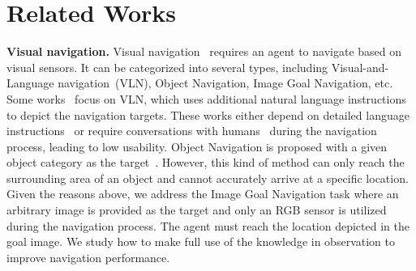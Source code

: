 \section{Related Works}
\textbf{Visual navigation.} Visual navigation~\cite{krantz2023navigating,kwon2023renderable,pelluri2024transformers,li2023improving,liu2024caven,sun2024fgprompt,wang2024lookahead,zhao2024over} requires an agent to navigate based on visual sensors. It can be categorized into several types, including Visual-and-Language navigation~(VLN), Object Navigation, Image Goal Navigation, etc. Some works~\cite{anderson2018vision,chen2021history,li2022envedit,krantz2023iterative} focus on VLN, which uses additional natural language instructions to depict the navigation targets. These works either depend on detailed language instructions~\cite{wang2023scaling, li2023kerm} or require conversations with humans~\cite{zhang2024dialoc, thomason2020vision} during the navigation process, leading to low usability. 
Object Navigation is proposed with a given object category as the target~\cite{chaplot2020object,mayo2021visual,du2023object, zhang2024imagine}. However, this kind of method can only reach the surrounding area of an object and cannot accurately arrive at a specific location.
Given the reasons above, we address the Image Goal Navigation task where an arbitrary image is provided as the target and only an RGB sensor is utilized during the navigation process. The agent must reach the location depicted in the goal image. We study how to make full use of the knowledge in observation to improve navigation performance.


